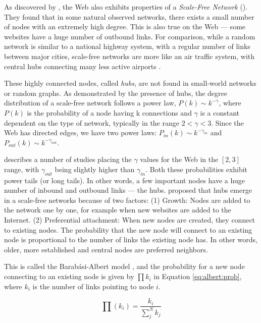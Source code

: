 As discovered by \cite{Albert1999}, the Web also exhibits properties of a \emph{Scale-Free Network} (). 
They found that in some natural observed networks, there exists a small number of nodes with an extremely high degree. 
This is also true on the Web --- some websites have a huge number of outbound links. 
For comparison, while a random network is similar to a national highway system, with a regular number of links between major cities, scale-free networks are more like an air traffic system, with central hubs connecting many less active airports \citep[p71]{Barabasi2003}.

These highly connected nodes, called \emph{hubs}, are not found in small-world networks or random graphs. As demonstrated by the presence of hubs, the degree distribution of a scale-free network follows a power law, 
$P(k) \sim k^{-\gamma}$, 
where $P(k)$ is the probability of a node having k connections and $\gamma$ is a constant dependent on the type of network, typically in the range $2 < \gamma < 3$. 
Since the Web has directed edges,
we have two power laws:
$P_{in}(k) \sim k^{-\gamma_{in}}$ and 
$P_{out}(k) \sim k^{-\gamma_{out}}$.

\cite{Albert1999} describes a number of studies placing the $\gamma$ values for the Web in the $[2,3]$ range, 
with $\gamma_{out}$ being slightly higher than $\gamma_{in}$. 
Both these probabilities exhibit power tails (or long tails). 
In other words, a few important nodes have a huge number of inbound and outbound links --- the hubs. 
\citet[p86]{Barabasi2003} proposed that hubs emerge in a scale-free networks because of two factors:
(1) Growth: Nodes are added to the network one by one, for example when new websites are added to the Internet.
(2) Preferential attachment: When new nodes are created, they connect to existing nodes. The probability that the new node will connect to an existing node is proportional to the number of links the existing node has. In other words, older, more established and central nodes are preferred neighbors.

This is called the Barab\'{a}si-Albert model \citep{Albert1999}, 
and the probability for a new node connecting to an existing node is given by $\prod k_i$ in Equation \ref{eq:albert:prob}, 
where $k_i$ is the number of links pointing to node $i$. 

\begin{equation}\label{eq:albert:prob}
  \prod(k_i)  = \frac{k_i}{\sum_{j}^N k_j}
\end{equation} 

